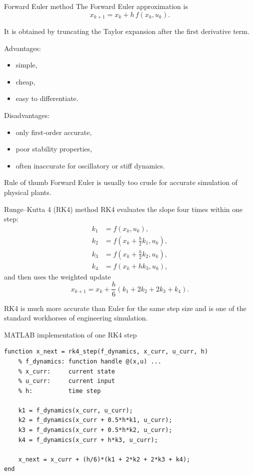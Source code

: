 \documentclass[aspectratio=169,10pt]{beamer}
\begin{document}
\begin{frame}{Forward Euler method}
The Forward Euler approximation is
\[
x_{k+1}=x_k + h\,f(x_k,u_k).
\]

It is obtained by truncating the Taylor expansion after the first derivative term.

Advantages:
\begin{itemize}
  \item simple,
  \item cheap,
  \item easy to differentiate.
\end{itemize}

Disadvantages:
\begin{itemize}
  \item only first-order accurate,
  \item poor stability properties,
  \item often inaccurate for oscillatory or stiff dynamics.
\end{itemize}

\begin{alertbox}{Rule of thumb}
Forward Euler is usually too crude for accurate simulation of physical plants.
\end{alertbox}
\end{frame}

\begin{frame}{Runge--Kutta 4 (RK4) method}
RK4 evaluates the slope four times within one step:
\begin{align*}
k_1 &= f(x_k,u_k),\\
k_2 &= f\left(x_k+\frac{h}{2}k_1,u_k\right),\\
k_3 &= f\left(x_k+\frac{h}{2}k_2,u_k\right),\\
k_4 &= f(x_k+h k_3,u_k),
\end{align*}
and then uses the weighted update
\[
x_{k+1}=x_k+\frac{h}{6}(k_1+2k_2+2k_3+k_4).
\]

RK4 is much more accurate than Euler for the same step size and is one of the standard workhorses of engineering simulation.
\end{frame}

\begin{frame}[fragile]{MATLAB implementation of one RK4 step}
\begin{lstlisting}[caption={Generic MATLAB implementation of one RK4 step.}]
function x_next = rk4_step(f_dynamics, x_curr, u_curr, h)
    % f_dynamics: function handle @(x,u) ...
    % x_curr:     current state
    % u_curr:     current input
    % h:          time step

    k1 = f_dynamics(x_curr, u_curr);
    k2 = f_dynamics(x_curr + 0.5*h*k1, u_curr);
    k3 = f_dynamics(x_curr + 0.5*h*k2, u_curr);
    k4 = f_dynamics(x_curr + h*k3, u_curr);

    x_next = x_curr + (h/6)*(k1 + 2*k2 + 2*k3 + k4);
end
\end{lstlisting}
\end{frame}
\end{document}
